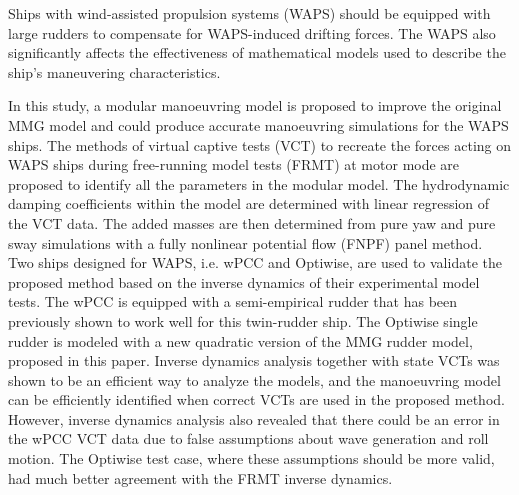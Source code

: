 Ships with wind-assisted propulsion systems (WAPS) should be equipped with large rudders to compensate for WAPS-induced drifting forces. The WAPS also significantly affects the effectiveness of mathematical models used to describe the ship's maneuvering characteristics.

In this study, a modular manoeuvring model is proposed to improve the original MMG model and could produce accurate manoeuvring simulations for the WAPS ships. 
The methods of virtual captive tests (VCT) to recreate the forces acting on WAPS ships during free-running model tests (FRMT) at motor mode are proposed to identify all the parameters in the modular model. 
The hydrodynamic damping coefficients within the model are determined with linear regression of the VCT data. The added masses are then determined from pure yaw and pure sway simulations with a fully nonlinear potential flow (FNPF) panel method.
Two ships designed for WAPS, i.e. wPCC and Optiwise, are used to validate the proposed method based on the inverse dynamics of their experimental model tests. The wPCC is equipped with a semi-empirical rudder that has been previously shown to work well for this twin-rudder ship. The Optiwise single rudder is modeled with a new quadratic version of the MMG rudder model, proposed in this paper. 
Inverse dynamics analysis together with state VCTs was shown to be an efficient way to analyze the models, and the manoeuvring model can be efficiently identified when correct VCTs are used in the proposed method.
However, inverse dynamics analysis also revealed that there could be an error in the wPCC VCT data due to false assumptions about wave generation and roll motion. The Optiwise test case, where these assumptions should be more valid, had much better agreement with the FRMT inverse dynamics. 


%    

